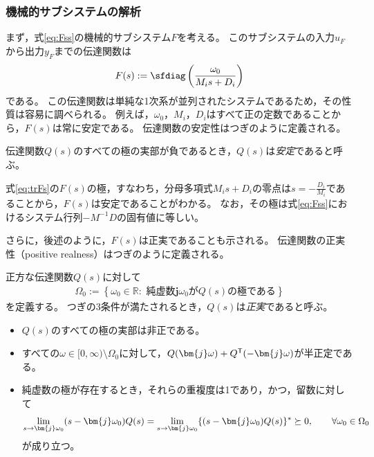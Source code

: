 \documentclass[tombow,dvipdfmx]{corona-a5}
\begin{document}
\subsubsection{機械的サブシステムの解析}

まず，式\ref{eq:Fss}の機械的サブシステム$F$を考える。
このサブシステムの入力$u_F$から出力$y_F$までの伝達関数は
\begin{align}\label{eq:trFs}
F(s) :=  
\sfdiag \left( 
\frac{\omega_0}{M_i s + D_i}
\right)
\end{align}
である。
この伝達関数は単純な1次系が並列されたシステムであるため，その性質は容易に調べられる。
例えば，$\omega_0$，$M_i$，$D_i$はすべて正の定数であることから，$F(s)$は常に安定である。
伝達関数の安定性はつぎのように定義される。

\begin{定義}[伝達関数の安定性]\label{def:trsta}
伝達関数$Q(s)$のすべての極の実部が負であるとき，$Q(s)$は\emph{安定}であると呼ぶ。
\end{定義}

式\ref{eq:trFs}の$F(s)$の極，すなわち，分母多項式$M_i s + D_i$の零点は$s=-\frac{D_i}{M_i}$であることから，$F(s)$は安定であることがわかる。
なお，その極は式\ref{eq:Fss}におけるシステム行列$-M^{-1}D$の固有値に等しい。

さらに，後述のように，$F(s)$は正実であることも示される。
伝達関数の正実性（positive realness）はつぎのように定義される。

\begin{定義}[伝達関数の正実性]\label{def:trpf}
正方な伝達関数$Q(s)$に対して
\begin{align}\label{eq:defOm0}
\Omega_0 := \left\{
\omega_0 \in \mathbb{R}: 
\mbox{ 純虚数$\bm{j} \omega_0$が$Q(s)$の極である}
\right\}
\end{align}
を定義する。
つぎの3条件が満たされるとき，$Q(s)$は\emph{正実}であると呼ぶ。
\begin{itemize}
\item $Q(s)$のすべての極の実部は非正である。
\item すべての$\omega \in [0,\infty)\setminus \Omega_0$に対して，$Q(\bm{j} \omega) + Q^{\sf T}(-\bm{j} \omega)$が半正定である。
\item 純虚数の極が存在するとき，それらの重複度は1であり，かつ，留数に対して
\begin{align*}
\lim_{s \rightarrow \bm{j} \omega_0} (s-\bm{j} \omega_0) Q(s) = \lim_{s\rightarrow \bm{j} \omega_0} \{ (s-\bm{j} \omega_0) Q(s)\}^{\sf *}\succeq 0
,\qquad
\forall \omega_0 \in \Omega_0
\end{align*}
が成り立つ。
\end{itemize}
\end{定義}
\end{document}
